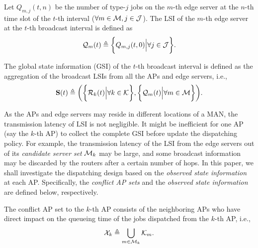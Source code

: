 \begin{definition}
    Let $Q_{m,j}({t,n})$ be the number of type-$j$ jobs on the $m$-th edge server at the $n$-th time slot of the $t$-th interval ($\forall m\in\mathcal{M}, j\in\mathcal{J}$).
    The LSI of the $m$-th edge server at the $t$-th broadcast interval is defined as
    \begin{align}
        \mathcal{Q}_{m}(t) \triangleq \bigg\{
            Q_{m,j}(t, 0) \Big| \forall j\in\mathcal{J}
        \bigg\}.
    \end{align}
\end{definition}

\begin{definition}
    The global state information (GSI) of the $t$-th broadcast interval is defined as the aggregation of the broadcast LSIs from all the APs and edge servers, i.e.,
    \begin{align}
        \mathbf{S}(t) \triangleq
            \bigg(
                \bigg\{\mathcal{R}_{k}(t) \Big| \forall k\in\mathcal{K}\bigg\},
                \bigg\{\mathcal{Q}_{m}(t) \Big| \forall m\in\mathcal{M}\bigg\}
            \bigg).
    \end{align}
\end{definition}

As the APs and edge servers may reside in different locations of a MAN, the transmission latency of LSI is not negligible.
It might be inefficient for one AP (say the $k$-th AP) to collect the complete GSI before update the dispatching policy.
For example, the transmission latency of the LSI from the edge servers out of its \emph{candidate server set} $\mathcal{M}_{k}$ may be large, and some broadcast information may be discarded by the routers after a certain number of hops.
In this paper, we shall investigate the dispatching design based on the \emph{observed state information} at each AP.
Specifically, the \emph{conflict AP sets} and the \emph{observed state information} are defined below, respectively.
\begin{definition}
    The conflict AP set to the $k$-th AP consists of the neighboring APs who have direct impact on the queueing time of the jobs dispatched from the $k$-th AP, i.e.,
    \begin{align}
        \mathcal{X}_{k} \triangleq \bigcup_{m\in\mathcal{M}_{k}} \mathcal{K}_{m}.
    \end{align}
\end{definition}


